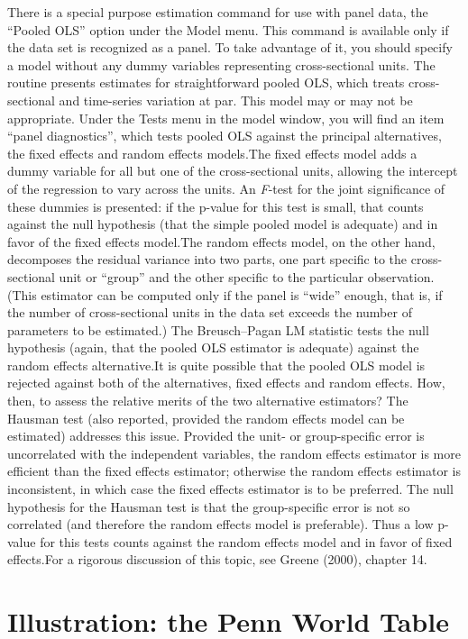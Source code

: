 There is a special purpose estimation command for use with panel data,
the ``Pooled OLS'' option under the \textsf{Model} menu. This command
is available only if the data set is recognized as a panel.  To take
advantage of it, you should specify a model without any dummy
variables representing cross-sectional units.  The routine presents
estimates for straightforward pooled OLS, which treats cross-sectional
and time-series variation at par.  This model may or may not be
appropriate.  Under the \textsf{Tests} menu in the model window, you
will find an item ``panel diagnostics'', which tests pooled OLS
against the principal alternatives, the fixed effects and random
effects models.The fixed effects model adds a dummy variable for all
but one of the cross-sectional units, allowing the intercept of the
regression to vary across the units.  An \emph{F}-test for the joint
significance of these dummies is presented: if the p-value for this
test is small, that counts against the null hypothesis (that the
simple pooled model is adequate) and in favor of the fixed effects
model.The random effects model, on the other hand, decomposes the
residual variance into two parts, one part specific to the
cross-sectional unit or ``group'' and the other specific to the
particular observation.  (This estimator can be computed only if the
panel is ``wide'' enough, that is, if the number of cross-sectional
units in the data set exceeds the number of parameters to be
estimated.)  The Breusch--Pagan LM statistic tests the null hypothesis
(again, that the pooled OLS estimator is adequate) against the random
effects alternative.It is quite possible that the pooled OLS model is
rejected against both of the alternatives, fixed effects and random
effects. How, then, to assess the relative merits of the two
alternative estimators?  The Hausman test (also reported, provided the
random effects model can be estimated) addresses this issue.  Provided
the unit- or group-specific error is uncorrelated with the independent
variables, the random effects estimator is more efficient than the
fixed effects estimator; otherwise the random effects estimator is
inconsistent, in which case the fixed effects estimator is to be
preferred.  The null hypothesis for the Hausman test is that the
group-specific error is not so correlated (and therefore the random
effects model is preferable).  Thus a low p-value for this tests
counts against the random effects model and in favor of fixed
effects.For a rigorous discussion of this topic, see Greene (2000),
chapter 14.

\section{Illustration: the Penn World Table}
\label{PWT}

